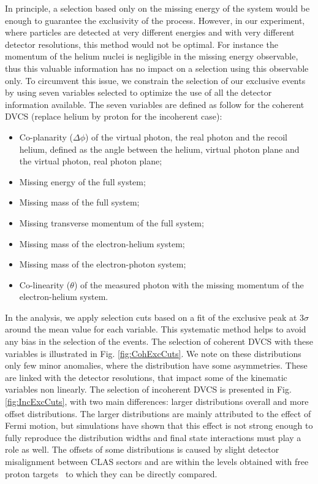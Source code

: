 \documentclass{article}
\begin{document}
In principle, 
a selection based only on the missing energy of the system would be
enough to guarantee the 
exclusivity of the process. However, in our experiment, where particles 
are detected at very different energies and with very different detector 
resolutions, this method would not be optimal. For instance the momentum 
of the helium nuclei is negligible in the missing energy observable, thus
this valuable information has no impact on a selection using this observable only.
To circumvent this issue, we constrain the selection of our exclusive events by using seven 
variables selected to optimize the use of all the detector information available. 
The seven variables are defined as follow for the coherent 
DVCS (replace helium by proton for the incoherent case):
\begin{itemize}
	\item Co-planarity ($\Delta \phi$) of the virtual photon, the real photon and
		the recoil helium, defined as the angle between the helium, virtual photon
		plane and the virtual photon, real photon plane;
	\item Missing energy of the full system;
	\item Missing mass of the full system;
	\item Missing transverse momentum of the full system;
	\item Missing mass of the electron-helium system;
	\item Missing mass of the electron-photon system;
	\item Co-linearity ($\theta$) of the measured photon with the missing momentum of the 
		electron-helium system.
\end{itemize}

In the analysis, we apply selection cuts based on a fit of the exclusive peak at 3$\sigma$ around 
the mean value for each variable. This systematic method helps to avoid any bias 
in the selection of the events. The selection of coherent DVCS with these variables is illustrated in 
Fig. \ref{fig:CohExcCuts}. We note on these distributions only few minor anomalies, where the 
distribution have some asymmetries. These are linked with the detector resolutions, that impact
some of the kinematic variables non linearly. The selection of incoherent DVCS is presented in 
Fig. \ref{fig:IncExcCuts}, with two main differences: larger distributions overall and more
offset distributions. The larger distributions are mainly attributed to the effect of 
Fermi motion, but simulations have shown that this effect is not strong enough to fully 
reproduce the distribution widths and final state interactions must play a role as well. 
The offsets of some distributions is caused by slight detector 
misalignment between CLAS sectors and are within the levels obtained with free proton 
targets~\cite{HirlingerSaylor:2018bnu} to which they can be directly compared. 
\end{document}
